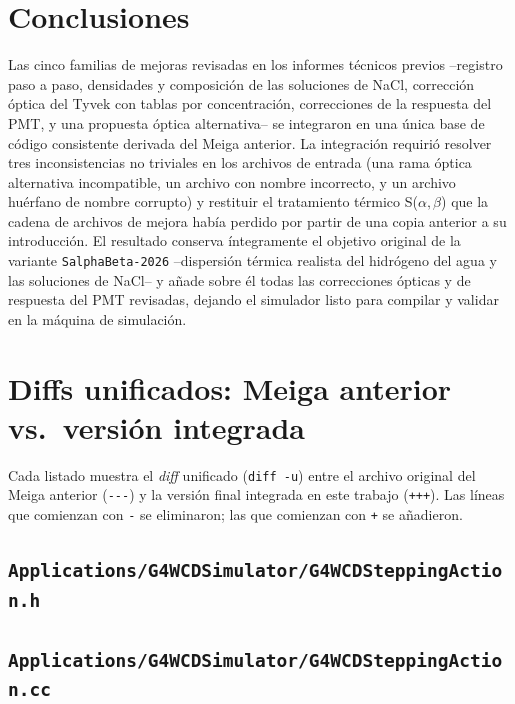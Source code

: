 \documentclass[11pt,a4paper]{article}
\newcommand{\codigo}[1]{\nolinkurl{#1}}
\begin{document}
\section{Conclusiones}

Las cinco familias de mejoras revisadas en los informes técnicos previos
--registro paso a paso, densidades y composición de las soluciones de
NaCl, corrección óptica del Tyvek con tablas por concentración,
correcciones de la respuesta del PMT, y una propuesta óptica alternativa--
se integraron en una única base de código consistente derivada del Meiga
anterior. La integración requirió resolver tres inconsistencias no
triviales en los archivos de entrada (una rama óptica alternativa
incompatible, un archivo con nombre incorrecto, y un archivo huérfano de
nombre corrupto) y restituir el tratamiento térmico S($\alpha,\beta$) que
la cadena de archivos de mejora había perdido por partir de una copia
anterior a su introducción. El resultado conserva íntegramente el objetivo
original de la variante \codigo{SalphaBeta-2026} --dispersión térmica
realista del hidrógeno del agua y las soluciones de NaCl-- y añade sobre
él todas las correcciones ópticas y de respuesta del PMT revisadas,
dejando el simulador listo para compilar y validar en la máquina de
simulación.

\appendix

\section{Diffs unificados: Meiga anterior vs.\ versión integrada}
\label{ap:diffs}

Cada listado muestra el \emph{diff} unificado (\codigo{diff -u}) entre el
archivo original del Meiga anterior (\codigo{---}) y la versión final
integrada en este trabajo (\codigo{+++}). Las líneas que comienzan con
\codigo{-} se eliminaron; las que comienzan con \codigo{+} se añadieron.

\subsection{\texorpdfstring{\codigo{Applications/G4WCDSimulator/G4WCDSteppingAction.h}}{Applications/G4WCDSimulator/G4WCDSteppingAction.h}}


\subsection{\texorpdfstring{\codigo{Applications/G4WCDSimulator/G4WCDSteppingAction.cc}}{Applications/G4WCDSimulator/G4WCDSteppingAction.cc}}

\end{document}
